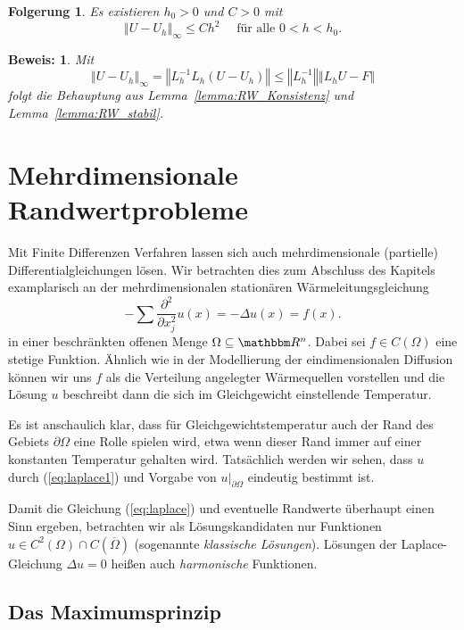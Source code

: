 \documentclass[12pt,a4paper]{book}
\theoremstyle{break}
\newtheorem{korollar}[theorem]{Folgerung}
\theoremstyle{nonumberplain}
\newtheorem{beweis}{Beweis:}
\newcommand{\R}{\mathbbm R}
\newcommand{\norm}[1]{\left\Vert#1\right\Vert}		%
\newcommand{\1}{\mathbbm{1}} 			      	%
\newcommand{\labeq}[1]{\label{eq:#1}}			%
\newcommand{\req}[1]{(\ref{eq:#1})}
\begin{document}
\begin{korollar}
Es existieren $h_0>0$ und $C>0$ mit 
\[
\norm{U-U_h}_\infty\leq C h^2 \quad \mbox{ für alle } 0<h<h_0.
\]
\end{korollar}
\begin{beweis}
Mit
\[
\norm{U-U_h}_\infty = \norm{L_h^{-1} L_h (U-U_h)}\leq \norm{L_h^{-1}} \norm{L_h U-F}
\]
folgt die Behauptung aus Lemma~\ref{lemma:RW_Konsistenz} und Lemma~\ref{lemma:RW_stabil}.
\end{beweis}


\section{Mehrdimensionale Randwertprobleme}

Mit Finite Differenzen Verfahren lassen sich auch mehrdimensionale (partielle) Differentialgleichungen
lösen. Wir betrachten dies zum Abschluss des Kapitels examplarisch an der mehrdimensionalen 
stationären Wärmeleitungsgleichung
\begin{equation}\labeq{laplace1}
-\sum \frac{\partial^2}{\partial x_j^2} u(x)=-\Delta u(x)=f(x).
\end{equation}
in einer beschränkten offenen Menge $\Omega\subseteq \R^n$. Dabei sei $f\in C(\Omega)$ eine stetige Funktion.
Ähnlich wie in der Modellierung der eindimensionalen Diffusion können wir uns $f$ als die Verteilung angelegter
Wärmequellen vorstellen und die Lösung $u$ beschreibt dann die sich im Gleichgewicht einstellende Temperatur.

Es ist anschaulich klar, dass für Gleichgewichtstemperatur auch der Rand des Gebiets
$\partial \Omega$ eine Rolle spielen wird, etwa wenn dieser Rand immer auf einer konstanten Temperatur gehalten wird.
Tatsächlich werden wir sehen, dass $u$ durch \req{laplace1} und Vorgabe von $u|_{\partial \Omega}$ eindeutig bestimmt ist.

Damit die Gleichung \req{laplace} und eventuelle Randwerte überhaupt einen Sinn ergeben,
betrachten wir als Lösungskandidaten nur Funktionen $u\in C^2(\Omega)\cap C(\overline \Omega)$ (sogenannte \emph{klassische Lösungen}). Lösungen der Laplace-Gleichung $\Delta u=0$ heißen auch \emph{harmonische} Funktionen.

\subsection{Das Maximumsprinzip}
\end{document}
